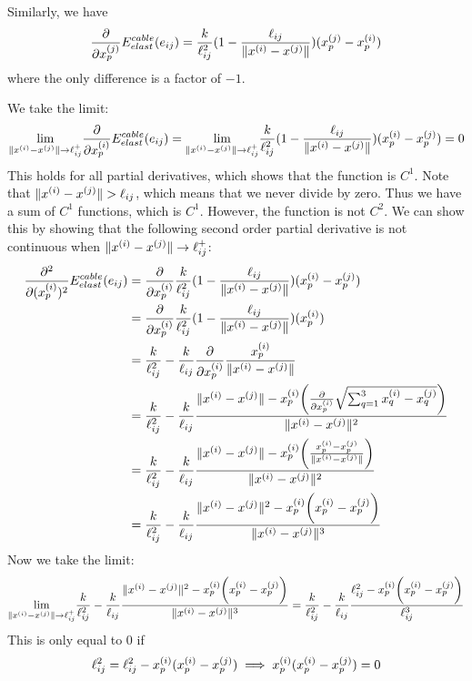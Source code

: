 Similarly, we have 
\begin{equation}
    \frac{\partial}{\partial x_p^{(j)}} E^{cable}_{elast}(e_{ij}) =  \frac{k}{\ell_{ij}^2} (1- \frac{\ell_{ij}}{\lVert x^{(i)} - x^{(j)}\rVert}) (x_p^{(j)} - x_p^{(i)})
\end{equation} where the only difference is a factor of $-1$.

We take the limit:
\begin{equation}
    \underset{\lVert x^{(i)} - x^{(j)}\rVert \to \ell_{ij} ^+}{\text{lim}} \frac{\partial}{\partial x_p^{(i)}} E^{cable}_{elast}(e_{ij}) =    \underset{\lVert x^{(i)} - x^{(j)}\rVert \to \ell_{ij} ^+}{\text{lim}} \frac{k}{\ell_{ij}^2} (1- \frac{\ell_{ij}}{\lVert x^{(i)} - x^{(j)}\rVert}) (x_p^{(i)} - x_p^{(j)}) = 0
\end{equation}
This holds for all partial derivatives, which shows that the function is $C^1$. Note that $\lVert x^{(i)} - x^{(j)}\rVert>\ell_{ij}$, which means that we never divide by zero. Thus we have a sum of $C^1$ functions, which is $C^1$. However, the function is not $C^2$. We can show this by showing that the following second order partial derivative is not continuous when $\lVert x^{(i)} - x^{(j)}\rVert \to \ell_{ij}^+$:
\begin{align*}
    \frac{\partial^2}{\partial (x_p^{(i)})^2} E^{cable}_{elast}(e_{ij}) &= 
    \frac{\partial}{\partial x_p^{(i)}} \frac{k}{\ell_{ij}^2} (1- \frac{\ell_{ij}}{\lVert x^{(i)} - x^{(j)}\rVert}) (x_p^{(i)} - x_p^{(j)}) \\&
    = \frac{\partial}{\partial x_p^{(i)}} \frac{k}{\ell_{ij}^2} (1- \frac{\ell_{ij}}{\lVert x^{(i)} - x^{(j)}\rVert}) (x_p^{(i)}) \\&
    =\frac{k}{\ell_{ij}^2} - \frac{k}{\ell_{ij}} \frac{\partial}{\partial x_p^{(i)}} \frac{x_p^{(i)}}{\lVert x^{(i)} - x^{(j)}\rVert} \\&
    =\frac{k}{\ell_{ij}^2} -\frac{k}{\ell_{ij}} \frac{\lVert x^{(i)} - x^{(j)}\rVert - x_p^{(i)} \bigg( \frac{\partial}{\partial x_p^{(i)}} \sqrt{\sum_{q=1}^3 x_q^{(i)}-x_q^{(j)}} \bigg)}{\lVert x^{(i)} - x^{(j)}\rVert^2} \\&
    =\frac{k}{\ell_{ij}^2} -\frac{k}{\ell_{ij}} \frac{\lVert x^{(i)} - x^{(j)}\rVert - x_p^{(i)} \bigg( \frac{x_p^{(i)}-x_p^{(j)}}{\lVert x^{(i)} - x^{(j)}\rVert} \bigg)}{\lVert x^{(i)} - x^{(j)}\rVert^2} \\&
    =\frac{k}{\ell_{ij}^2} -\frac{k}{\ell_{ij}} \frac{\lVert x^{(i)} - x^{(j)}\rVert^2 - x_p^{(i)} \bigg( x_p^{(i)}-x_p^{(j)} \bigg)}{\lVert x^{(i)} - x^{(j)}\rVert^3}
\end{align*}
Now we take the limit:
\begin{align*}
    \underset{\xnorm \to \el ^+}{\text{lim}} %
    \frac{k}{\el^2} -\frac{k}{\el} \frac{\xnorm^2 - x_p^{(i)} \bigg( x_p^{(i)}-x_p^{(j)} \bigg)}{\xnorm^3}
    = \frac{k}{\el^2} -\frac{k}{\el} \frac{\el^2 - x_p^{(i)} \bigg( x_p^{(i)}-x_p^{(j)} \bigg)}{\el^3}
\end{align*}
This is only equal to $0$ if 
\begin{equation}
     \ell_{ij}^2 = \ell_{ij}^2 - x_p^{(i)}(x_p^{(i)}-x_p^{(j)}) \implies
     x_p^{(i)}(x_p^{(i)}-x_p^{(j)})=0
\end{equation}

